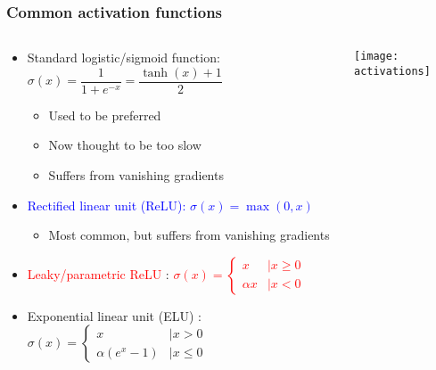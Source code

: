 \begin{frame}
    \frametitle{Common activation functions}
    \begin{columns}
        \begin{column}{2.5in}
            \begin{itemize}
                \item \textcolor{Green4}{Standard logistic/sigmoid function: $\sigma(x) = \dfrac{1}{1 + e^{-x}} = \dfrac{\tanh(x) + 1}{2}$}
                \begin{itemize}
                    \item Used to be preferred
                    \item Now thought to be too slow
                    \item Suffers from vanishing gradients
                \end{itemize}
                \item \textcolor{blue}{Rectified linear unit (ReLU): $\sigma(x) = \max(0, x)$}
                \begin{itemize}
                    \item Most common, but suffers from vanishing gradients
                \end{itemize}
                \item \textcolor{red}{Leaky/parametric ReLU} \citep{MaasICML13}:
                \textcolor{red}{
                    $\sigma(x) = \begin{cases}
                        x &\mid x \ge 0 \\
                        \alpha x &| x < 0
                    \end{cases}$
                }
                \item \textcolor{Magenta3}{Exponential linear unit (ELU)} \citep{ClevertICLR16}:
                \textcolor{Magenta3}{
                    $\sigma(x) = \begin{cases}
                        x &\mid x > 0 \\
                        \alpha (e^x - 1) &\mid x \le 0
                    \end{cases}$
                }
            \end{itemize}
        \end{column}
        \begin{column}{2in}
            \texttt{[image: activations]}
        \end{column}
    \end{columns}
\end{frame}

